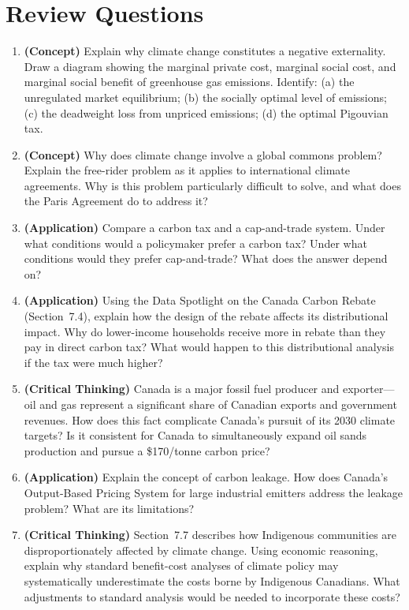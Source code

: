 \section*{Review Questions}

\begin{enumerate}

\item \textbf{(Concept)} Explain why climate change constitutes a negative externality. Draw a diagram showing the marginal private cost, marginal social cost, and marginal social benefit of greenhouse gas emissions. Identify: (a) the unregulated market equilibrium; (b) the socially optimal level of emissions; (c) the deadweight loss from unpriced emissions; (d) the optimal Pigouvian tax.

\item \textbf{(Concept)} Why does climate change involve a global commons problem? Explain the free-rider problem as it applies to international climate agreements. Why is this problem particularly difficult to solve, and what does the Paris Agreement do to address it?

\item \textbf{(Application)} Compare a carbon tax and a cap-and-trade system. Under what conditions would a policymaker prefer a carbon tax? Under what conditions would they prefer cap-and-trade? What does the answer depend on?

\item \textbf{(Application)} Using the Data Spotlight on the Canada Carbon Rebate (Section~7.4), explain how the design of the rebate affects its distributional impact. Why do lower-income households receive more in rebate than they pay in direct carbon tax? What would happen to this distributional analysis if the tax were much higher?

\item \textbf{(Critical Thinking)} Canada is a major fossil fuel producer and exporter---oil and gas represent a significant share of Canadian exports and government revenues. How does this fact complicate Canada's pursuit of its 2030 climate targets? Is it consistent for Canada to simultaneously expand oil sands production and pursue a \$170/tonne carbon price?

\item \textbf{(Application)} Explain the concept of carbon leakage. How does Canada's Output-Based Pricing System for large industrial emitters address the leakage problem? What are its limitations?

\item \textbf{(Critical Thinking)} Section~7.7 describes how Indigenous communities are disproportionately affected by climate change. Using economic reasoning, explain why standard benefit-cost analyses of climate policy may systematically underestimate the costs borne by Indigenous Canadians. What adjustments to standard analysis would be needed to incorporate these costs?

\end{enumerate}

